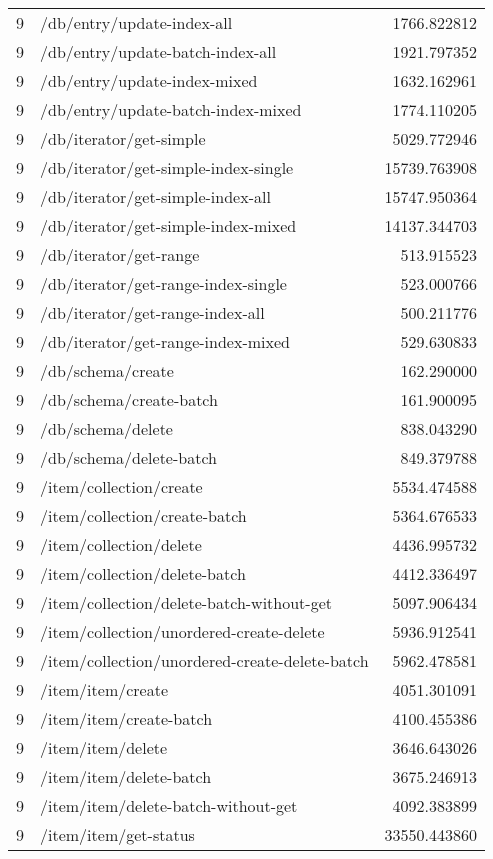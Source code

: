 \begin{longtable}{rlr}
9 & /db/entry/update-index-all & 1766.822812 \\
9 & /db/entry/update-batch-index-all & 1921.797352 \\
9 & /db/entry/update-index-mixed & 1632.162961 \\
9 & /db/entry/update-batch-index-mixed & 1774.110205 \\
9 & /db/iterator/get-simple & 5029.772946 \\
9 & /db/iterator/get-simple-index-single & 15739.763908 \\
9 & /db/iterator/get-simple-index-all & 15747.950364 \\
9 & /db/iterator/get-simple-index-mixed & 14137.344703 \\
9 & /db/iterator/get-range & 513.915523 \\
9 & /db/iterator/get-range-index-single & 523.000766 \\
9 & /db/iterator/get-range-index-all & 500.211776 \\
9 & /db/iterator/get-range-index-mixed & 529.630833 \\
9 & /db/schema/create & 162.290000 \\
9 & /db/schema/create-batch & 161.900095 \\
9 & /db/schema/delete & 838.043290 \\
9 & /db/schema/delete-batch & 849.379788 \\
9 & /item/collection/create & 5534.474588 \\
9 & /item/collection/create-batch & 5364.676533 \\
9 & /item/collection/delete & 4436.995732 \\
9 & /item/collection/delete-batch & 4412.336497 \\
9 & /item/collection/delete-batch-without-get & 5097.906434 \\
9 & /item/collection/unordered-create-delete & 5936.912541 \\
9 & /item/collection/unordered-create-delete-batch & 5962.478581 \\
9 & /item/item/create & 4051.301091 \\
9 & /item/item/create-batch & 4100.455386 \\
9 & /item/item/delete & 3646.643026 \\
9 & /item/item/delete-batch & 3675.246913 \\
9 & /item/item/delete-batch-without-get & 4092.383899 \\
9 & /item/item/get-status & 33550.443860 \\

\end{longtable}

